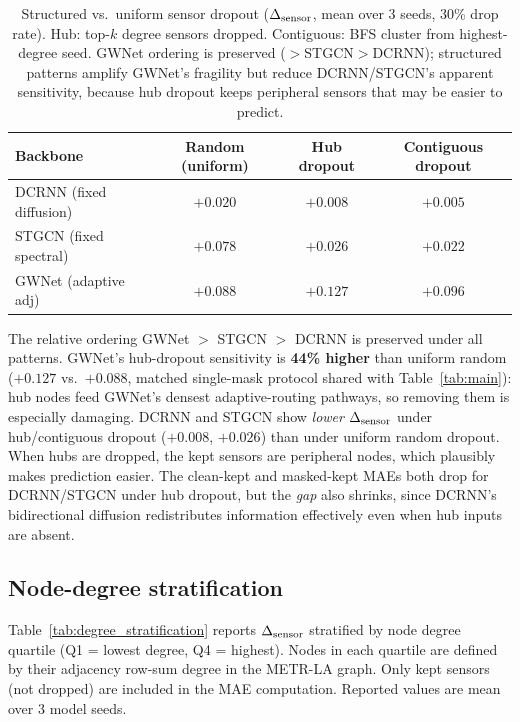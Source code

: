 \begin{table}[h]
\centering
\caption{Structured vs.\ uniform sensor dropout ($\Delta_{\text{sensor}}$, mean over 3 seeds, 30\% drop rate).
Hub: top-$k$ degree sensors dropped.
Contiguous: BFS cluster from highest-degree seed.
GWNet ordering is preserved ($>$STGCN$>$DCRNN); structured patterns amplify GWNet's fragility
but reduce DCRNN/STGCN's apparent sensitivity, because hub dropout keeps peripheral
sensors that may be easier to predict.}
\label{tab:structured_dropout}
\vskip 0.1in
\small
\begin{tabular}{lccc}
\toprule
\textbf{Backbone} & \textbf{Random (uniform)} & \textbf{Hub dropout} & \textbf{Contiguous dropout} \\
\midrule
DCRNN (fixed diffusion) & $+0.020$ & $+0.008$ & $+0.005$ \\
STGCN (fixed spectral)  & $+0.078$ & $+0.026$ & $+0.022$ \\
GWNet (adaptive adj)    & $+0.088$ & $+0.127$ & $+0.096$ \\
\bottomrule
\end{tabular}
\end{table}

The relative ordering GWNet $>$ STGCN $>$ DCRNN is preserved under all patterns.
GWNet's hub-dropout sensitivity is \textbf{44\% higher} than uniform random ($+0.127$ vs.\ $+0.088$,
matched single-mask protocol shared with Table~\ref{tab:main}):
hub nodes feed GWNet's densest adaptive-routing pathways, so removing them is especially damaging.
DCRNN and STGCN show \emph{lower} $\Delta_{\text{sensor}}$ under hub/contiguous dropout ($+0.008$, $+0.026$)
than under uniform random dropout. When hubs are dropped, the
kept sensors are peripheral nodes, which plausibly makes prediction easier. The clean-kept and masked-kept MAEs both drop for DCRNN/STGCN under hub
dropout, but the \emph{gap} also shrinks, since DCRNN's bidirectional diffusion redistributes
information effectively even when hub inputs are absent.

\subsection{Node-degree stratification}
\label{sec:appendix_degree_stratification}

Table~\ref{tab:degree_stratification} reports $\Delta_{\text{sensor}}$ stratified by node degree
quartile (Q1 = lowest degree, Q4 = highest).
Nodes in each quartile are defined by their adjacency row-sum degree in the METR-LA graph.
Only kept sensors (not dropped) are included in the MAE computation.
Reported values are mean over 3 model seeds.


